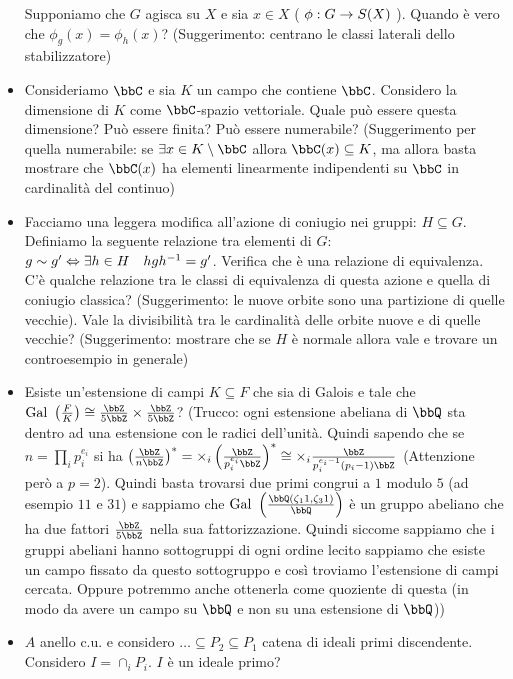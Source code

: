 \documentclass[a4paper,11pt,NoNotes,GeneralMath]{stdmdoc}
\begin{document}
\begin{itemize}
		Supponiamo che $G$ agisca su $X$ e sia $x \in X$ ( $\phi: G \rightarrow S(X)$ ). Quando è vero che $\phi_g(x) = \phi_h(x)$? (Suggerimento: centrano le classi laterali dello stabilizzatore)
		\item Consideriamo $\bbC$ e sia $K$ un campo che contiene $\bbC$. Considero la dimensione di $K$ come $\bbC$-spazio vettoriale. Quale può essere questa dimensione? Può essere finita? Può essere numerabile? (Suggerimento per quella numerabile: se $\exists x \in K \setminus \bbC$ allora $\bbC (x) \subseteq K$, ma allora basta mostrare che $\bbC (x)$ ha elementi linearmente indipendenti su $\bbC$ in cardinalità del continuo)
		\item Facciamo una leggera modifica all'azione di coniugio nei gruppi: $H \subseteq G$. Definiamo la seguente relazione tra elementi di $G$: $g \sim g' \Leftrightarrow \exists h \in H \quad hgh^{-1} = g'$. Verifica che è una relazione di equivalenza. C'è qualche relazione tra le classi di equivalenza di questa azione e quella di coniugio classica? (Suggerimento: le nuove orbite sono una partizione di quelle vecchie). Vale la divisibilità tra le cardinalità delle orbite nuove e di quelle vecchie? (Suggerimento: mostrare che se $H$ è normale allora vale e trovare un controesempio in generale)
		\item Esiste un'estensione di campi $K \subseteq F$ che sia di Galois e tale che $\text{Gal } \left( \frac{F}{K} \right) \cong \frac{\bbZ}{5 \bbZ} \times \frac{\bbZ}{5 \bbZ}$? (Trucco: ogni estensione abeliana di $\bbQ$ sta dentro ad una estensione con le radici dell'unità. Quindi sapendo che se $n = \prod_i p_i^{e_i}$ si ha $\left( \frac{\bbZ}{n \bbZ} \right) ^{*} = \times_i \left( \frac{\bbZ}{p_i^{e_i} \bbZ} \right) ^ {*} \cong \times_i \frac{\bbZ}{p_i^{e_i - 1} (p_i - 1) \bbZ}$ (Attenzione però a $p = 2$). Quindi basta trovarsi due primi congrui a $1$ modulo $5$ (ad esempio $11$ e $31$) e sappiamo che $\text{Gal } \left( \frac{\bbQ (\zeta_11, \zeta_31)}{\bbQ} \right)$ è un gruppo abeliano che ha due fattori $\frac{\bbZ}{5\bbZ}$ nella sua fattorizzazione. Quindi siccome sappiamo che i gruppi abeliani hanno sottogruppi di ogni ordine lecito sappiamo che esiste un campo fissato da questo sottogruppo e così troviamo l'estensione di campi cercata. Oppure potremmo anche ottenerla come quoziente di questa (in modo da avere un campo su $\bbQ$ e non su una estensione di $\bbQ$))
		\item $A$ anello c.u. e considero $\ldots \subseteq P_2 \subseteq P_1$ catena di ideali primi discendente. Considero $I = \cap_i P_i$. $I$ è un ideale primo?

\end{itemize}
\end{document}
